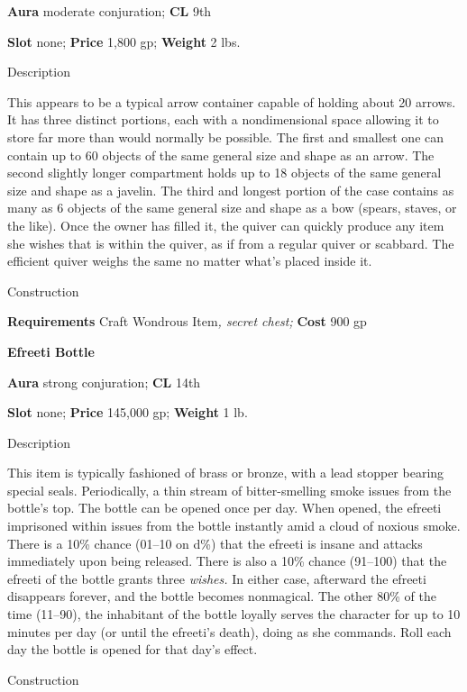 \textbf{Aura} moderate conjuration;\textbf{ CL }9th
				
\textbf{Slot} none; \textbf{Price} 1,800 gp; \textbf{Weight} 2 lbs.
				
Description
				
This appears to be a typical arrow container capable of holding about 20 arrows. It has three distinct portions, each with a nondimensional space allowing it to store far more than would normally be possible. The first and smallest one can contain up to 60 objects of the same general size and shape as an arrow. The second slightly longer compartment holds up to 18 objects of the same general size and shape as a javelin. The third and longest portion of the case contains as many as 6 objects of the same general size and shape as a bow (spears, staves, or the like). Once the owner has filled it, the quiver can quickly produce any item she wishes that is within the quiver, as if from a regular quiver or scabbard. The efficient quiver weighs the same no matter what's placed inside it. 
				
Construction
				
\textbf{Requirements} Craft Wondrous Item\textit{, secret chest;} \textbf{Cost} 900 gp
				
\textbf{Efreeti Bottle}
				
\textbf{Aura} strong conjuration;\textbf{ CL }14th
				
\textbf{Slot} none; \textbf{Price} 145,000 gp; \textbf{Weight} 1 lb.
				
Description
				
This item is typically fashioned of brass or bronze, with a lead stopper bearing special seals. Periodically, a thin stream of bitter-smelling smoke issues from the bottle's top. The bottle can be opened once per day. When opened, the efreeti imprisoned within issues from the bottle instantly amid a cloud of noxious smoke. There is a 10\% chance (01--10 on d\%) that the efreeti is insane and attacks immediately upon being released. There is also a 10\% chance (91--100) that the efreeti of the bottle grants three \textit{wishes.} In either case, afterward the efreeti disappears forever, and the bottle becomes nonmagical. The other 80\% of the time (11--90), the inhabitant of the bottle loyally serves the character for up to 10 minutes per day (or until the efreeti's death), doing as she commands. Roll each day the bottle is opened for that day's effect. 
				
Construction
				
